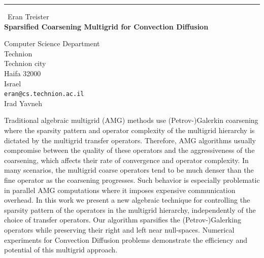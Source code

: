 \documentclass{report}
\begin{document}
\begin{center}
\rule{6in}{1pt} \
{\large Eran Treister \\
{\bf Sparsified Coarsening Multigrid for Convection Diffusion}}

Computer Science Department \\ Technion \\ Technion city \\ Haifa 32000 \\ Israel
\\
{\tt eran@cs.technion.ac.il}\\
Irad Yavneh\end{center}

Traditional algebraic multigrid (AMG) methods use (Petrov-)Galerkin
coarsening where the sparsity pattern and operator complexity of the
multigrid hierarchy is dictated by the multigrid transfer operators.
Therefore, AMG algorithms usually compromise between the quality of these
operators and the aggressiveness of the coarsening, which affects their
rate of convergence and operator complexity. In many scenarios, the
multigrid coarse operators tend to be much denser than the fine operator
as the coarsening progresses. Such behavior is especially problematic in
parallel AMG computations where it imposes expensive communication
overhead. In this work we present a new algebraic technique for
controlling the sparsity pattern of the operators in the multigrid
hierarchy, independently of the choice of transfer operators. Our
algorithm sparsifies the (Petrov-)Galerking operators while preserving
their right and left near null-spaces. Numerical experiments for
Convection Diffusion problems demonstrate the efficiency and potential of
this multigrid approach.
\end{document}
